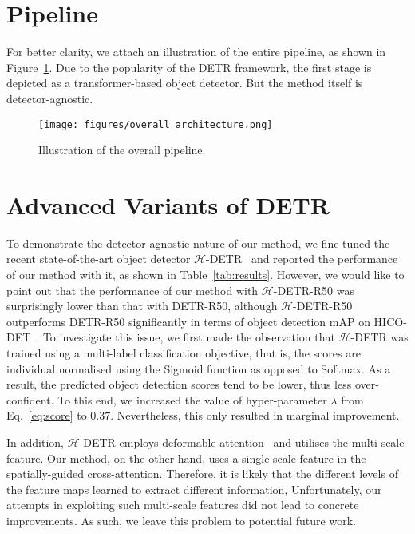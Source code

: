 \documentclass[10pt,twocolumn,letterpaper]{article}
\begin{document}
\section{Pipeline}

For better clarity, we attach an illustration of the entire pipeline, as shown in Figure~\ref{fig:pipeline}. Due to the popularity of the DETR framework, the first stage is depicted as a transformer-based object detector. But the method itself is detector-agnostic.

\begin{figure}
    \centering
    \texttt{[image: figures/overall\_architecture.png]}
    \caption{Illustration of the overall pipeline.}
    \label{fig:pipeline}
\end{figure}

\section{Advanced Variants of DETR}

To demonstrate the detector-agnostic nature of our method,
we fine-tuned the recent state-of-the-art object detector $\mathcal{H}$-DETR~\cite{hdetr}
and reported the performance of our method with it, as shown in Table~\ref{tab:results}.
However, we would like to point out that the performance of our method with $\mathcal{H}$-DETR-R50
was surprisingly lower than that with DETR-R50,
although $\mathcal{H}$-DETR-R50 outperforms DETR-R50 significantly in terms of object detection mAP on HICO-DET~\cite{hicodet}.
To investigate this issue,
we first made the observation that $\mathcal{H}$-DETR was trained using a multi-label classification objective,
that is, the scores are individual normalised using the Sigmoid function as opposed to Softmax.
As a result, the predicted object detection scores tend to be lower, thus less over-confident.
To this end, we increased the value of hyper-parameter $\lambda$ from Eq.~\ref{eq:score} to $0.37$.
Nevertheless, this only resulted in marginal improvement.

In addition, $\mathcal{H}$-DETR employs deformable attention~\cite{deform-detr} and utilises the multi-scale feature.
Our method, on the other hand, uses a single-scale feature in the spatially-guided cross-attention.
Therefore, it is likely that the different levels of the feature maps learned to extract different information,
Unfortunately, our attempts in exploiting such multi-scale features did not lead to concrete improvements.
As such, we leave this problem to potential future work.
\end{document}
